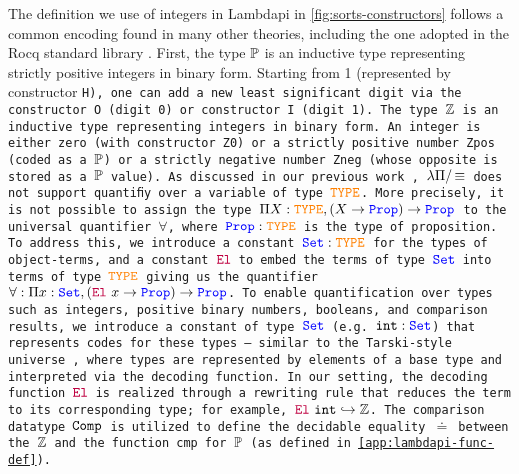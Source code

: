The definition we use of integers in Lambdapi in \cref{fig:sorts-constructors} follows a common encoding found in many other theories, including the one adopted in the Rocq standard library \cite{Rocq-refman}.
First, the type $\bb{P}$  is an inductive type representing strictly positive integers in binary form.
Starting from 1 (represented by constructor \tt{H}), one can add a new least significant digit via the constructor \tt{O} (digit 0) or constructor \tt{I} (digit 1). 
The type $\bb{Z}$ is an inductive type representing integers in binary form.
An integer is either zero (with constructor \tt{Z0}) or a strictly positive number \tt{Zpos} (coded as a $\bb{P}$) or a strictly negative number \tt{Zneg} (whose opposite is stored as a $\bb{P}$ value).
%
As discussed in our previous work \cite{ColtellacciMD24}, $\lpm$ does not support quantiﬁy over a variable of type $\type$. More precisely, it is not possible to assign the type $\Pi X : \type,(X \ra \prop) \ra \prop$ to the universal quantifier $\forall$, where $\prop: \type$ is the type of proposition.
To address this, we introduce a constant $\set : \type$ for the types of object-terms, and a constant ${\el}$ to embed the terms of type $\set$ into terms of type $\type$ giving us the quantifier $\forall: \Pi x: \set, (\el~x \ra \prop) \ra \prop$.
%
To enable quantification over types such as integers, positive binary numbers, booleans, and comparison results, we introduce a constant of type $\set$ (e.g. $\tt{int}: \set$) that represents codes for these types — similar to the Tarski-style universe \cite[\S Universes]{intuitype},
where types are represented by elements of a base type and interpreted via the decoding function. In our setting, the decoding function $\el$  is realized through a rewriting rule that reduces the term to its corresponding type; for example, $\el~\tt{int} \re \bb{Z}$.
The comparison datatype $\tt{Comp}$ is utilized to define the decidable equality $\doteq$ between the $\bb{Z}$ and the function \tt{cmp} for $\bb{P}$ (as defined in \cref{app:lambdapi-func-def}).


